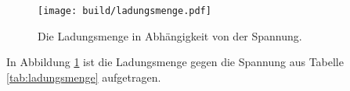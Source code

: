 \begin{figure}
  \centering
  \texttt{[image: build/ladungsmenge.pdf]}
  \caption{Die Ladungsmenge in Abhängigkeit von der Spannung.}
  \label{fig:ladungsmenge}
\end{figure}

In Abbildung \ref{fig:ladungsmenge} ist die Ladungsmenge gegen die Spannung aus Tabelle
\ref{tab:ladungsmenge} aufgetragen.
